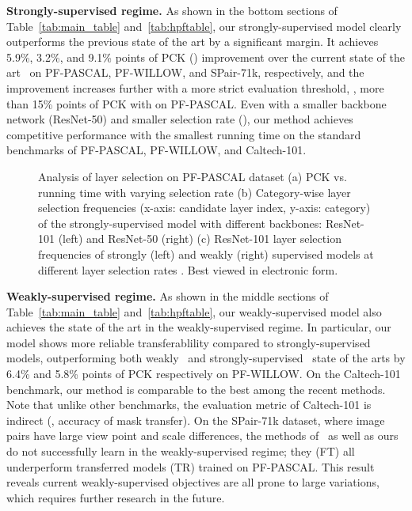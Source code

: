 \documentclass[runningheads]{llncs}
\begin{document}
\smallbreak
\noindent \textbf{Strongly-supervised regime.} As shown in the bottom sections of Table~\ref{tab:main_table} and~\ref{tab:hpftable}, our strongly-supervised model clearly outperforms the previous state of the art by a significant margin. It achieves 5.9\%, 3.2\%, and 9.1\% points of PCK () improvement over the current state of the art~\cite{min2019hyperpixel} on PF-PASCAL, PF-WILLOW, and SPair-71k, respectively, and the improvement increases further with a more strict evaluation threshold, \eg, more than 15\% points of PCK with  on PF-PASCAL. Even with a smaller backbone network (ResNet-50) and smaller selection rate (), our method achieves competitive performance with the smallest running time on the standard benchmarks of PF-PASCAL, PF-WILLOW, and Caltech-101.

\begin{figure}[!t]
    \begin{center}

    \caption{Analysis of layer selection on PF-PASCAL dataset (a) PCK vs. running time with varying selection rate  (b) Category-wise layer selection frequencies (x-axis: candidate layer index, y-axis: category) of the strongly-supervised model with different backbones: ResNet-101 (left) and ResNet-50 (right) (c) ResNet-101 layer selection frequencies of strongly (left) and weakly (right) supervised models at different layer selection rates . Best viewed in electronic form.}
    \label{fig:layer_selection}
    \end{center}    
\end{figure}

\smallbreak
\noindent \textbf{Weakly-supervised regime.} As shown in the middle sections of Table~\ref{tab:main_table} and~\ref{tab:hpftable}, our weakly-supervised model also achieves the state of the art in the weakly-supervised regime.  
In particular, our model shows more reliable transferablility compared to strongly-supervised models, outperforming both weakly~\cite{huang2019dynamic} and strongly-supervised~\cite{min2019hyperpixel} state of the arts by 6.4\% and 5.8\% points of PCK respectively on PF-WILLOW. On the Caltech-101 benchmark, our method is comparable to the best among the recent methods. 
Note that unlike other benchmarks, the evaluation metric of Caltech-101 is indirect (\ie, accuracy of mask transfer). 
On the SPair-71k dataset, where image pairs have large view point and scale differences, the methods of~\cite{rocco18weak,rocco2018neighbourhood} as well as ours do not successfully learn in the weakly-supervised regime; they (FT) all underperform transferred models (TR) trained on PF-PASCAL. This result reveals current weakly-supervised objectives are all prone to large variations, which requires further research in the future.
\end{document}
